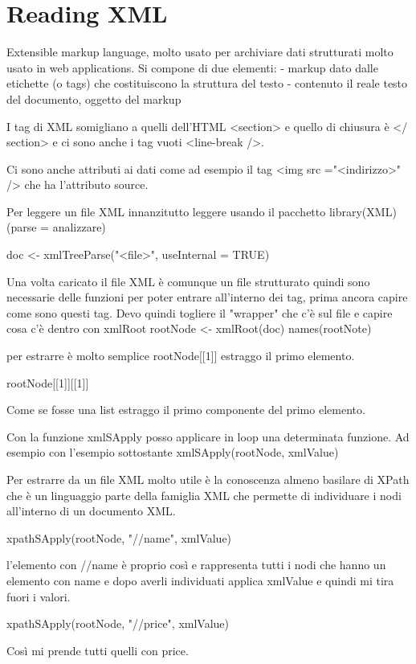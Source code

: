 \section{Reading XML}

Extensible markup language, molto usato per archiviare dati strutturati molto usato in web applications.
Si compone di due elementi:
- markup dato dalle etichette (o tags) che costituiscono la struttura del testo
- contenuto il reale testo del documento, oggetto del markup

I tag di XML somigliano a quelli dell'HTML <section> e quello di chiusura è </ section>
e ci sono anche i tag vuoti <line-break />.

Ci sono anche attributi ai dati come ad esempio il tag
<img src ="<indirizzo>" />
che ha l'attributo source.

Per leggere un file XML innanzitutto leggere usando il pacchetto library(XML) (parse =  analizzare)

doc <- xmlTreeParse("<file>", useInternal = TRUE)

Una volta caricato il file XML è comunque un file strutturato quindi sono necessarie delle funzioni per poter entrare all'interno dei tag, prima ancora capire come sono questi tag.
Devo quindi togliere il "wrapper" che c'è sul file e capire cosa c'è dentro con xmlRoot
rootNode <- xmlRoot(doc)
names(rootNote)

per estrarre è molto semplice rootNode[[1]] estraggo il primo elemento.

rootNode[[1]][[1]]

Come se fosse una list estraggo il primo componente del primo elemento.

Con la funzione xmlSApply posso applicare in loop una determinata funzione.
Ad esempio con l'esempio sottostante
xmlSApply(rootNode, xmlValue)

Per estrarre da un file XML molto utile è la conoscenza almeno basilare di XPath che è un linguaggio parte della famiglia XML che permette di individuare i nodi all'interno di un documento XML.

xpathSApply(rootNode, "//name", xmlValue)

l'elemento con //name è proprio così e rappresenta tutti i nodi che hanno un elemento con name e dopo averli individuati applica xmlValue e quindi mi tira fuori i valori.

xpathSApply(rootNode, "//price", xmlValue)

Così mi prende tutti quelli con price.

